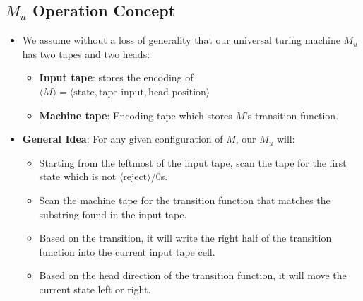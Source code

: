 \subsection{$M_u$ Operation Concept}
\begin{itemize}
    \item We assume without a loss of generality that our universal turing machine $M_u$ has two tapes and two heads:
    \begin{itemize}
        \item \textbf{Input tape}: stores the encoding of $\langle M \rangle = \langle \text{state}, \text{tape input}, \text{head position} \rangle$
        \item \textbf{Machine tape}: Encoding tape which stores $M$'s transition function.
    \end{itemize}
    \item \textbf{General Idea}: For any given configuration of $M$, our $M_u$ will:
    \begin{itemize}
        \item Starting from the leftmost of the input tape, scan the tape for the first state which is not $\langle \text{reject} \rangle$/$0$s.
        \item Scan the machine tape for the transition function that matches the substring found in the input tape.
        \item Based on the transition, it will write the right half of the transition function into the current input tape cell.
        \item Based on the head direction of the transition function, it will move the current state left or right.
    \end{itemize}
\end{itemize}

